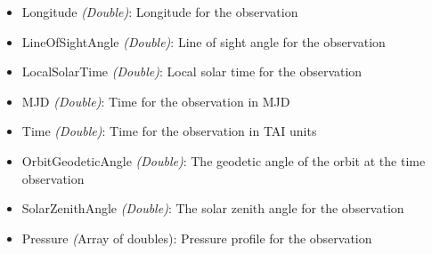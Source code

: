 \begin{itemize}
\begin{itemize}
            \item Longitude \emph{(Double)}: Longitude for the observation
            \item LineOfSightAngle \emph{(Double)}: Line of sight angle for the
                observation
            \item LocalSolarTime \emph{(Double)}: Local solar time for the
                observation
            \item MJD \emph{(Double)}: Time for the observation in MJD
            \item Time \emph{(Double)}: Time for the observation in TAI units
            \item OrbitGeodeticAngle \emph{(Double)}: The geodetic angle of the
                orbit at the time observation
            \item SolarZenithAngle \emph{(Double)}: The solar zenith angle for
                the observation
            \item Pressure \emph({Array of doubles}): Pressure profile for the
                observation
        \end{itemize}
\end{itemize}

